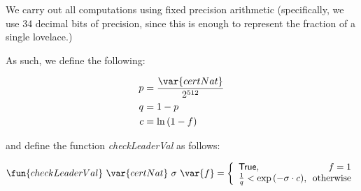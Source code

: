 We carry out all computations using fixed precision arithmetic (specifically, we
use 34 decimal bits of precision, since this is enough to represent the fraction
of a single lovelace.)

As such, we define the following:

\begin{align*}
  p & = \frac{\var{certNat}}{2^{512}} \\
  q & = 1 - p \\
  c & = \ln{(1 - f)}
\end{align*}

and define the function \textit{checkLeaderVal} as follows:

\begin{equation*}
  \fun{checkLeaderVal}~\var{certNat}~\sigma~\var{f} =
    \left\{
      \begin{array}{l@{~}r}
        \mathsf{True}, & f = 1 \\
        \frac{1}{q} < \exp{(-\sigma \cdot c)}, & \text{ otherwise}
      \end{array}
    \right.
\end{equation*}

